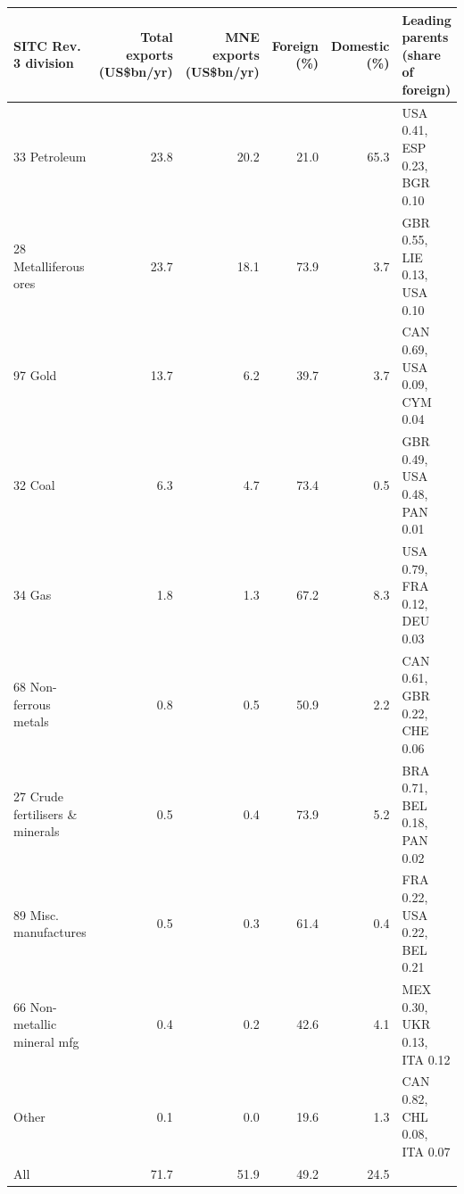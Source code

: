 \begin{tabular}{@{}l r r r r l@{}}
\toprule
SITC Rev.\,3 division & Total exports (US\$bn/yr) & MNE exports (US\$bn/yr) & Foreign (\%) & Domestic (\%) & Leading parents (share of foreign) \\
\midrule
33 Petroleum & 23.8 & 20.2 & 21.0 & 65.3 & USA 0.41, ESP 0.23, BGR 0.10 \\
28 Metalliferous ores & 23.7 & 18.1 & 73.9 & 3.7 & GBR 0.55, LIE 0.13, USA 0.10 \\
97 Gold & 13.7 & 6.2 & 39.7 & 3.7 & CAN 0.69, USA 0.09, CYM 0.04 \\
32 Coal & 6.3 & 4.7 & 73.4 & 0.5 & GBR 0.49, USA 0.48, PAN 0.01 \\
34 Gas & 1.8 & 1.3 & 67.2 & 8.3 & USA 0.79, FRA 0.12, DEU 0.03 \\
68 Non-ferrous metals & 0.8 & 0.5 & 50.9 & 2.2 & CAN 0.61, GBR 0.22, CHE 0.06 \\
27 Crude fertilisers \& minerals & 0.5 & 0.4 & 73.9 & 5.2 & BRA 0.71, BEL 0.18, PAN 0.02 \\
89 Misc. manufactures & 0.5 & 0.3 & 61.4 & 0.4 & FRA 0.22, USA 0.22, BEL 0.21 \\
66 Non-metallic mineral mfg & 0.4 & 0.2 & 42.6 & 4.1 & MEX 0.30, UKR 0.13, ITA 0.12 \\
Other & 0.1 & 0.0 & 19.6 & 1.3 & CAN 0.82, CHL 0.08, ITA 0.07 \\
\midrule
All & 71.7 & 51.9 & 49.2 & 24.5 & \\
\bottomrule
\end{tabular}
